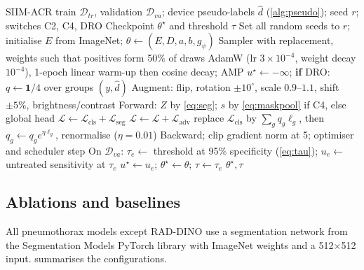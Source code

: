 \documentclass[final,3p]{elsarticle}
\begin{document}
\begin{algorithm}[!tbp]
\caption{Training one configuration with one seed (stages \emph{planb\_main\_a/b})}
\label{alg:train}
\begin{algorithmic}[1]
\Require SIIM-ACR train $\mathcal{D}_{tr}$, validation $\mathcal{D}_{va}$; device pseudo-labels $\hat d$ (\cref{alg:pseudo}); seed $r$; switches C2, C4, DRO
\Ensure Checkpoint $\theta^\star$ and threshold $\tau$
\State Set all random seeds to $r$; initialise $E$ from ImageNet; $\theta\gets(E,D,a,b,g_\psi)$
\State Sampler with replacement, weights such that positives form 50\% of draws
\State AdamW (lr $3\!\times\!10^{-4}$, weight decay $10^{-4}$), 1-epoch linear warm-up then cosine decay; AMP
\State $u^\star\gets-\infty$; \textbf{if} DRO: $q\gets\mathbf{1}/4$ over groups $(y,\hat d)$
    \State Augment: flip, rotation $\pm10^\circ$, scale $0.9$--$1.1$, shift $\pm5\%$, brightness/contrast
    \State Forward: $Z$ by \cref{eq:seg}; $s$ by \cref{eq:maskpool} if C4, else global head
    \State $\mathcal{L}\gets\mathcal{L}_{\text{cls}}+\mathcal{L}_{\text{seg}}$ 
     \State $\mathcal{L}\gets\mathcal{L}+\mathcal{L}_{\text{adv}}$  \label{line:adv}
    \EndIf
     \State replace $\mathcal{L}_{\text{cls}}$ by $\sum_g q_g\ell_g$, then $q_g\gets q_g e^{\eta\ell_g}$, renormalise ($\eta=0.01$) \label{line:dro}
    \EndIf
    \State Backward; clip gradient norm at 5; optimiser and scheduler step
  \EndFor
  \State On $\mathcal{D}_{va}$: $\tau_e\gets$ threshold at 95\% specificity (\cref{eq:tau}); $u_e\gets$ untreated sensitivity at $\tau_e$
   \State $u^\star\gets u_e$; $\theta^\star\gets\theta$; $\tau\gets\tau_e$ \label{line:select}
  \EndIf
\EndFor
\State \Return $\theta^\star,\tau$
\end{algorithmic}
\end{algorithm}

\subsection{Ablations and baselines}
\label{sec:baselines}
All pneumothorax models except RAD-DINO use a segmentation network from the Segmentation Models PyTorch library \citep{iakubovskii2019smp} with ImageNet weights and a 512$\times$512 input.  summarises the configurations.
\end{document}
